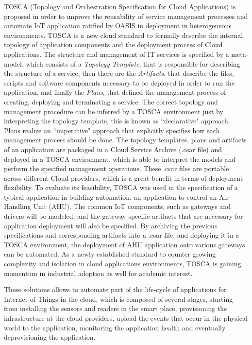 TOSCA (Topology and Orchestration Specification for Cloud Applications) \cite{li2013towards} is
proposed in order to improve the reusability of service management processes and automate IoT application
ratified by OASIS in deployment in heterogeneous environments. TOSCA is a new cloud standard to formally
describe the internal topology of application components and the deployment process of Cloud applications.
The structure and management of IT services is specified by a meta-model, which consists of
a \textit{Topology Template}, that is responsible for describing the structure of a service, then there
are the \textit{Artifacts}, that describe the files, scripts and software components necessary to be
deployed in order to run the application, and finally the \textit{Plans}, that defined the management process
of creating, deploying and terminating a service. The correct topology and management procedure can be inferred
by a TOSCA environment just by interpreting the topology template, this is known as ``declarative" approach.
Plans realize an ``imperative" approach that explicitly specifies how each management process should be done.
The topology templates, plans and artifacts of an application are packaged in a Cloud Service Archive (.csar file)
and deployed in a TOSCA environment, which is able to interpret the models and perform the specified management
operations. These .csar files are portable across different Cloud providers, which is a great benefit in terms
of deployment flexibility. To evaluate its feasibility, TOSCA was used in the specification of a typical
application in building automation. an application to control an Air Handling Unit (AHU). The common IoT
components, such as gateways and drivers will be modeled, and the gateway-specific artifacts that are
necessary for application deployment will also be specified. By archiving the previous specifications
and corresponding artifacts into a .csar file, and deploying it in a TOSCA environment, the deployment
of AHU application onto various gateways can be automated. As a newly established standard to counter
growing complexity and isolation in cloud applications environments, TOSCA is gaining momentum in industrial
adoption as well for academic interest.

These solutions allows to automate part of the life-cycle of applications for Internet of Things in the
cloud, which is composed of several stages, starting from installing the sensors
and readers in the smart place, provisioning the infrastructure at the cloud providers, upload the events
that occur in the physical world to the application, monitoring the application health and eventually
deprovisioning the application.
